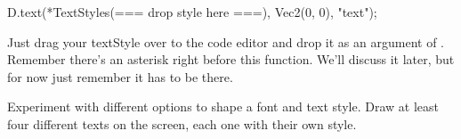 \begin{code}
D.text(*TextStyles(=== drop style here ===), Vec2(0, 0), "text");
\end{code}

Just drag your textStyle over to the code editor and drop it as an argument of . Remember there's an asterisk right before this function. We'll discuss it later, but for now just remember it has to be there.

\begin{exercise}
Experiment with different options to shape a font and text style. Draw at least four different texts on the screen, each one with their own style.
\end{exercise}